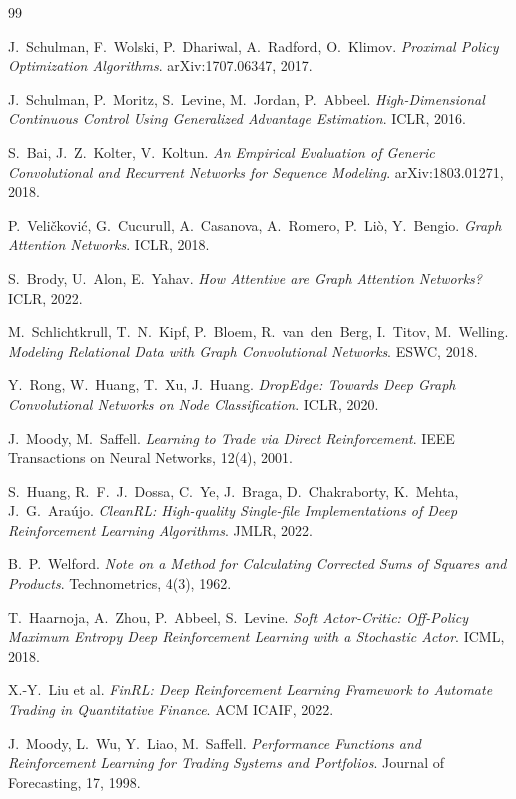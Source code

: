 \documentclass[11pt,a4paper]{article}
\begin{document}
\begin{thebibliography}{99}

J.~Schulman, F.~Wolski, P.~Dhariwal, A.~Radford, O.~Klimov.
\newblock \textit{Proximal Policy Optimization Algorithms}.
\newblock arXiv:1707.06347, 2017.

J.~Schulman, P.~Moritz, S.~Levine, M.~Jordan, P.~Abbeel.
\newblock \textit{High-Dimensional Continuous Control Using Generalized Advantage
Estimation}.
\newblock ICLR, 2016.

S.~Bai, J.~Z.~Kolter, V.~Koltun.
\newblock \textit{An Empirical Evaluation of Generic Convolutional and Recurrent
Networks for Sequence Modeling}.
\newblock arXiv:1803.01271, 2018.

P.~Veli\v{c}kovi\'c, G.~Cucurull, A.~Casanova, A.~Romero, P.~Li\`o, Y.~Bengio.
\newblock \textit{Graph Attention Networks}.
\newblock ICLR, 2018.

S.~Brody, U.~Alon, E.~Yahav.
\newblock \textit{How Attentive are Graph Attention Networks?}
\newblock ICLR, 2022.

M.~Schlichtkrull, T.~N.~Kipf, P.~Bloem, R.~van~den~Berg, I.~Titov, M.~Welling.
\newblock \textit{Modeling Relational Data with Graph Convolutional Networks}.
\newblock ESWC, 2018.

Y.~Rong, W.~Huang, T.~Xu, J.~Huang.
\newblock \textit{DropEdge: Towards Deep Graph Convolutional Networks on Node
Classification}.
\newblock ICLR, 2020.

J.~Moody, M.~Saffell.
\newblock \textit{Learning to Trade via Direct Reinforcement}.
\newblock IEEE Transactions on Neural Networks, 12(4), 2001.

S.~Huang, R.~F.~J.~Dossa, C.~Ye, J.~Braga, D.~Chakraborty, K.~Mehta, J.~G.~Ara\'ujo.
\newblock \textit{CleanRL: High-quality Single-file Implementations of Deep
Reinforcement Learning Algorithms}.
\newblock JMLR, 2022.

B.~P.~Welford.
\newblock \textit{Note on a Method for Calculating Corrected Sums of Squares and
Products}.
\newblock Technometrics, 4(3), 1962.

T.~Haarnoja, A.~Zhou, P.~Abbeel, S.~Levine.
\newblock \textit{Soft Actor-Critic: Off-Policy Maximum Entropy Deep
Reinforcement Learning with a Stochastic Actor}.
\newblock ICML, 2018.

X.-Y.~Liu et al.
\newblock \textit{FinRL: Deep Reinforcement Learning Framework to Automate
Trading in Quantitative Finance}.
\newblock ACM ICAIF, 2022.

J.~Moody, L.~Wu, Y.~Liao, M.~Saffell.
\newblock \textit{Performance Functions and Reinforcement Learning for Trading
Systems and Portfolios}.
\newblock Journal of Forecasting, 17, 1998.

\end{thebibliography}
\end{document}
